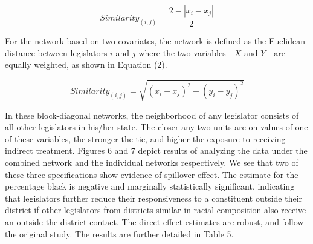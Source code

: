 \documentclass[12pt]{article}
\begin{document}
\begin{equation}
Similarity_{(i,j)} = \frac{2 - |x_i - x_j|}{2}
\end{equation}

For the network based on two covariates, the network is defined as the Euclidean distance between legislators $i$ and $j$ where the two variables---$X$ and $Y$---are equally weighted, as shown in Equation (2).

\begin{equation}
Similarity_{(i,j)} = \sqrt{{(x_i - x_j)}^2 + {(y_i - y_j)}^2}
\end{equation}

In these block-diagonal networks, the neighborhood of any legislator consists of all other legislators in his/her state. The closer any two units are on values of one of these variables, the stronger the tie, and higher the exposure to receiving indirect treatment. Figures 6 and 7 depict results of analyzing the \citet{broockman2013black} data under the combined network and the individual networks respectively. We see that two of these three specifications show evidence of spillover effect. The estimate for the percentage black is negative and marginally statistically significant, indicating that legislators further reduce their responsiveness to a constituent outside their district if other legislators from districts similar in racial composition also receive an outside-the-district contact. The direct effect estimates are robust, and follow the original study. The results are further detailed in Table 5.
\end{document}
